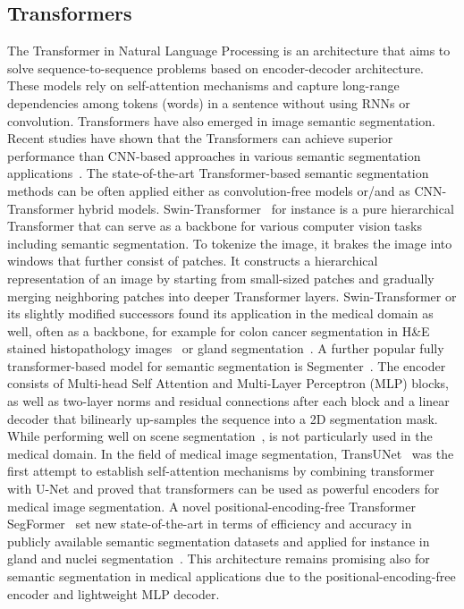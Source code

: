 \subsection{Transformers}
The Transformer in  Natural Language Processing is an architecture that aims to solve sequence-to-sequence problems based on encoder-decoder architecture. These models rely on self-attention mechanisms and capture long-range dependencies among tokens (words) in a sentence without using RNNs or convolution. Transformers have also emerged in image semantic segmentation. Recent studies have shown that the Transformers can achieve superior performance than CNN-based approaches in various semantic segmentation applications~\cite{nguyen2022evaluating}. The state-of-the-art Transformer-based semantic segmentation methods can be often applied either as convolution-free models or/and as CNN-Transformer hybrid models. Swin-Transformer~\cite{liu2021swin} for instance is a pure hierarchical Transformer that can serve as a  backbone for various computer vision tasks including semantic segmentation. To tokenize the image, it brakes the image into windows that further consist of patches. It constructs a hierarchical representation of an image by starting from small-sized patches and gradually merging neighboring patches into deeper Transformer layers. Swin-Transformer or its slightly modified successors found its application in the medical domain as well, often as a backbone, for example for colon cancer segmentation in H\&E stained histopathology images~\cite{qian2022transformer} or gland segmentation~\cite{lin2022ds}. A further popular fully transformer-based model for semantic segmentation is Segmenter~\cite{strudel2021segmenter}. The encoder consists of Multi-head Self Attention and Multi-Layer Perceptron (MLP) blocks, as well as two-layer norms and residual connections after each block and a linear decoder that bilinearly up-samples the sequence into a 2D segmentation mask. While performing well on scene segmentation~\cite{strudel2021segmenter}, is not particularly used in the medical domain. In the field of medical image segmentation, TransUNet~\cite{chen2021transunet} was the first attempt to establish self-attention mechanisms by combining transformer with U-Net and proved that transformers can be used as powerful encoders for medical image segmentation. A novel positional-encoding-free Transformer SegFormer~\cite{https://doi.org/10.48550/arxiv.2105.15203} set new state-of-the-art in terms of efficiency and accuracy in publicly available semantic segmentation datasets and applied for instance in gland and nuclei segmentation~\cite{lin2022ds}. This architecture remains promising also for semantic segmentation in medical applications due to the positional-encoding-free encoder and lightweight MLP decoder.

